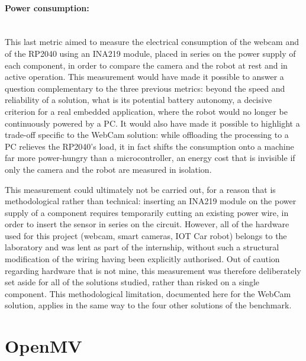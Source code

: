 \documentclass[12pt,a4paper]{report}
\begin{document}
	\paragraph{Power consumption:} \mbox{} \\
	This last metric aimed to measure the electrical consumption of the webcam and of the RP2040 using an INA219 module, placed in series on the power supply of each component, in order to compare the camera and the robot at rest and in active operation. This measurement would have made it possible to answer a question complementary to the three previous metrics: beyond the speed and reliability of a solution, what is its potential battery autonomy, a decisive criterion for a real embedded application, where the robot would no longer be continuously powered by a PC. It would also have made it possible to highlight a trade-off specific to the WebCam solution: while offloading the processing to a PC relieves the RP2040's load, it in fact shifts the consumption onto a machine far more power-hungry than a microcontroller, an energy cost that is invisible if only the camera and the robot are measured in isolation.
	
	This measurement could ultimately not be carried out, for a reason that is methodological rather than technical: inserting an INA219 module on the power supply of a component requires temporarily cutting an existing power wire, in order to insert the sensor in series on the circuit. However, all of the hardware used for this project (webcam, smart cameras, IOT Car robot) belongs to the laboratory and was lent as part of the internship, without such a structural modification of the wiring having been explicitly authorised. Out of caution regarding hardware that is not mine, this measurement was therefore deliberately set aside for all of the solutions studied, rather than risked on a single component. This methodological limitation, documented here for the WebCam solution, applies in the same way to the four other solutions of the benchmark.
	
	\newpage
	
	
	\section{OpenMV}
	\label{sec:openmv-limitation}
	
\end{document}
